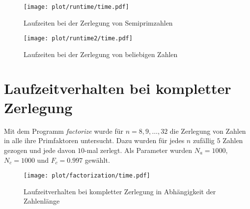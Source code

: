 \begin{figure}[ht]
		\centering
		\texttt{[image: plot/runtime/time.pdf]}
		\caption{Laufzeiten bei der Zerlegung von Semiprimzahlen}\label{fig:runtime-runtime}
\end{figure}
\begin{figure}[ht]
		\centering
		\texttt{[image: plot/runtime2/time.pdf]}
		\caption{Laufzeiten bei der Zerlegung von beliebigen Zahlen}\label{fig:runtime2-runtime}
\end{figure}

\section{Laufzeitverhalten bei kompletter Zerlegung}
Mit dem Programm \textit{factorize} wurde für $n=8,9,\dots,32$ die Zerlegung von Zahlen in alle ihre Primfaktoren untersucht. Dazu wurden für jedes $n$ zufällig $5$ Zahlen gezogen und jede davon $10$-mal zerlegt. Als Parameter wurden $N_a=1000$, $N_c=1000$ und $F_c=0.997$ gewählt.
\begin{figure}[ht]
		\centering
		\texttt{[image: plot/factorization/time.pdf]}
		\caption{Laufzeitverhalten bei kompletter Zerlegung in Abhängigkeit der Zahlenlänge}
\end{figure}
